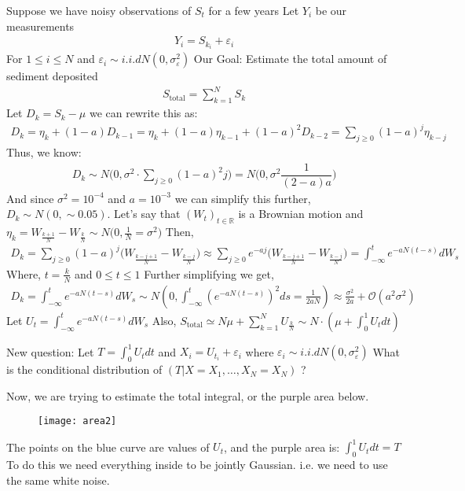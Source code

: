 \documentclass[../../../Master/AppliedStochastics.tex]{subfiles}
\begin{document}
Suppose we have noisy observations of $S_{t}$ for a few years 
Let $Y_{i}$ be our measurements 
$$\begin{aligned}
Y_{i} = S_{k_{i}} + \varepsilon_{i}  
\end{aligned}$$
For $1 \leq i \leq N$ and $\varepsilon_{i} \sim i.i.d N(0, 
\sigma_{\varepsilon}^2)$ 
Our Goal: Estimate the total amount of sediment deposited 
$$\begin{aligned}
S_{\mathrm{total}} = \sum_{k=1}^{N} S_{k}   
\end{aligned}$$
Let $D_{k} = S_{k}-\mu$ we can rewrite this as: 
$$\begin{aligned}
D_{k} = \eta_{k} + (1-a)D_{k-1} =  \eta_{k} + (1-a)\eta_{k-1} + (1-a)^2 D_{k-2} 
= \sum_{j\geq0}(1-a)^j \eta_{k-j}
\end{aligned}$$
Thus, we know: 
$$\begin{aligned}
D_{k}\sim N\bigg(0, \sigma^2 \cdot \sum_{j\geq0}(1-a)^2j\bigg) = N\bigg(0, 
\sigma^2 \dfrac{1}{(2-a)a}\bigg)
\end{aligned}$$
And since $\sigma^2 = 10^{-4}$ and $a=10^{-3}$ we can simplify this further, 
$D_{k} \sim N(0, \sim0.05)$. 
Let's say that $(W_{t})_{t\in\mathbb{R}}$ is a Brownian motion 
and $\eta_{k}= W_\frac{{k+1}}{N} - W_\frac{{k}}{N} \sim N\big(0, 
\frac{1}{N}=\sigma^2\big)$
Then, 
$$\begin{aligned}
D_{k}= \sum_{j\geq0} (1-a)^j \Big(W_\frac{{k-j+1}}{N} - W_\frac{{k-j}}{N} \Big) 
\approx \sum_{j\geq0} e^{-aj} \Big(W_\frac{{k-j+1}}{N} - W_\frac{{k-j}}{N} 
\Big) = \int_{-\infty}^{t} e^{-aN(t-s)}dW_{s}
\end{aligned}$$
Where, $t=\frac{k}{N}$ and $0\leq t \leq 1$ 
Further simplifying we get, 
$$\begin{aligned}
D_{k}= \int_{-\infty}^{t} e^{-aN(t-s)}dW_{s} \sim N(0, 
\int_{-\infty}^{t}(e^{-aN(t-s)})^2 ds = \frac{1}{2aN}) \approx 
\frac{\sigma^2}{2a} + \mathcal{O}(a^2\sigma^2)
\end{aligned}$$
Let $U_{t} = \int_{-\infty}^{t} e^{-aN(t-s)} dW_{s}$ 
Also, $S_{\mathrm{total}}\simeq N\mu + \sum_{k=1}^{N} U_{\frac{k}{N}} \sim 
N\cdot(\mu + \int_{0}^{1}U_{t}dt)$

New question: Let $T=\int_{0}^{1} U_{t}dt$ 
and $X_{i} = U_{t_{i}} + \varepsilon_{i}$ where $\varepsilon_{i}\sim i.i.d 
N(0,\sigma_{\varepsilon}^2)$ 
What is the conditional distribution of $(T\vert X=X_{1},\dotso, X_{N}=X_{N})$ 
? 

Now, we are trying to estimate the total integral, or the purple area below. 
\begin{figure}[H]
	\centering
	\texttt{[image: area2]}
	\caption*{}
	\label{fig:area2}
\end{figure}
The points on the blue curve are values of $U_{t}$, 
and the purple area is: $\int_{0}^{1} U_{t}dt = T$ 
To do this we need everything inside to be jointly Gaussian. 
i.e. we need to use the same white noise. 
\end{document}
